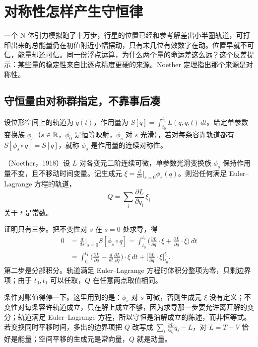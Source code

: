 \section{对称性怎样产生守恒律}
\label{sec:12-Real-Analysis-Support/10-Essential-Structures/01}

一个 N 体引力模拟跑了十万步，行星的位置已经和参考解差出小半圈轨道，可打印出来的总能量仍在初值附近小幅摆动，只有末几位有效数字在动。位置早就不可信，能量却还可信。同一份浮点运算，为什么两个量的命运差这么远？这个反差提示：某些量的稳定性来自比逐点精度更硬的来源。Noether 定理指出那个来源是对称性。

\subsection{守恒量由对称群指定，不靠事后凑}

设位形空间上的轨道为 \(q(t)\)，作用量为 \(S[q]=\int_{t_0}^{t_1}L(q,\dot q,t)\,dt\)。给定单参数变换族 \(\phi_s\)（\(s\in\mathbb{R}\)，\(\phi_0\) 是恒等映射，\(\phi_s\) 对 \(s\) 光滑），若对每条容许轨道都有 \(S[\phi_s\circ q]=S[q]\)，就称 \(\phi_s\) 是作用量的连续对称性。

\begin{theorem}
（Noether，1918）设 \(L\) 对各变元二阶连续可微，单参数光滑变换族 \(\phi_s\) 保持作用量不变，且不移动时间变量。记生成元 \(\xi=\frac{d}{ds}\big|_{s=0}\phi_s(q)\)。则沿任何满足 Euler--Lagrange 方程的轨道，
\[
Q=\sum_i \frac{\partial L}{\partial \dot q_i}\,\xi_i
\]
关于 \(t\) 是常数。
\end{theorem}

证明只有三步。把不变性对 \(s\) 在 \(s=0\) 处求导，得
\[
\begin{aligned}
0&=\frac{d}{ds}\Big|_{s=0}S[\phi_s\circ q]
=\int_{t_0}^{t_1}\Big(\frac{\partial L}{\partial q}\cdot\xi+\frac{\partial L}{\partial \dot q}\cdot\dot\xi\Big)\,dt\\
&=\int_{t_0}^{t_1}\Big(\frac{\partial L}{\partial q}-\frac{d}{dt}\frac{\partial L}{\partial \dot q}\Big)\cdot\xi\,dt
+\Big[\frac{\partial L}{\partial \dot q}\cdot\xi\Big]_{t_0}^{t_1}.
\end{aligned}
\]
第二步是分部积分。轨道满足 Euler--Lagrange 方程时体积分整项为零，只剩边界项；由于 \(t_0,t_1\) 可以任取，\(Q\) 在任意两点取值相同。

条件对账值得停一下。这里用到的是：\(\phi_s\) 对 \(s\) 可微，否则生成元 \(\xi\) 没有定义；不变性对每条容许轨道成立，只在解上成立不够，因为求导那一步要允许离开解的变分；轨道满足 Euler--Lagrange 方程，所以守恒是沿解成立的陈述，而非恒等式。若变换同时平移时间，多出的边界项把 \(Q\) 改写成 \(\sum_i\frac{\partial L}{\partial\dot q_i}\dot q_i-L\)，对 \(L=T-V\) 恰好是能量；空间平移的生成元是常向量，\(Q\) 就是动量。

